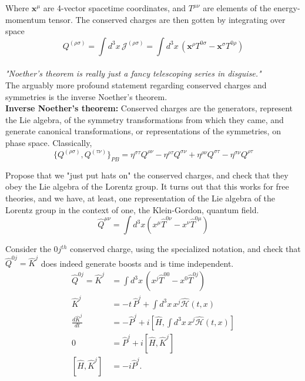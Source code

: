 \noindent Where $\textbf{x}^\mu$ are 4-vector spacetime coordinates, and $T^{\mu\nu}$ are elements of the energy-momentum tensor. The conserved charges are then gotten by integrating over space
\begin{equation}
Q^{(\rho\sigma)} = \int d^3 x \, \mathcal{J}^{(\rho\sigma)} = \int d^3x \,  (\textbf{x}^\rho T^{0\sigma} - \textbf{x}^\sigma T^{0\rho})
\end{equation}
\\
\textit{"Noether's theorem is really just a fancy telescoping series in disguise."} \\

\noindent The arguably more profound statement regarding conserved charges and symmetries is the inverse Noether's theorem. \\

\noindent \textbf{Inverse Noether's theorem:} Conserved charges are the generators, represent the Lie algebra, of the symmetry transformations from which they came, and generate canonical transformations, or representations of the symmetries, on phase space. Classically, 
\begin{equation}
\{Q^{(\rho\sigma)}, Q^{(\tau\nu)}\}_{PB} = \eta^{\sigma\tau}Q^{\rho\nu} - \eta^{\rho\tau}Q^{\sigma\nu} + \eta^{\rho\nu}Q^{\sigma\tau} - \eta^{\sigma\nu}Q^{\rho\tau}
\end{equation}

\noindent Propose that we "just put hats on" the conserved charges, and check that they obey the Lie algebra of the Lorentz group. It turns out that this works for free theories, and we have, at least, one representation of the Lie algebra of the Lorentz group in the context of one, the Klein-Gordon, quantum field.
\begin{equation}
\hat{Q}^{\mu\nu} = \int d^3 x (x^\mu \hat{T}^{0\nu} - x^\nu \hat{T}^{0\mu})
\end{equation}

\noindent Consider the $0j^{th}$ conserved charge, using the specialized notation, and check that $\hat{Q}^{0j} = \hat{K}^j$ does indeed generate boosts and is time independent.
\begin{align}
\hat{Q}^{0j} = \hat{K}^j &= \int d^3 x \, (x^j \hat{T}^{00} - x^0 \hat{T}^{0j}) \\
\hat{K}^j &= -t \, \hat{P}^j + \int d^3 x \, x^j \hat{\mathscr{H}}(t,x) \\
\frac{d \hat{K}^j }{dt} &= -\hat{P}^j + i [\hat{H}, \int d^3 x \, x^j \hat{\mathscr{H}}(t,x) ] \\
0 &= \hat{P}^j + i[\hat{H}, \hat{K}^j] \\
[\hat{H}, \hat{K}^j] &= -i \hat{P}^j .
\end{align}

